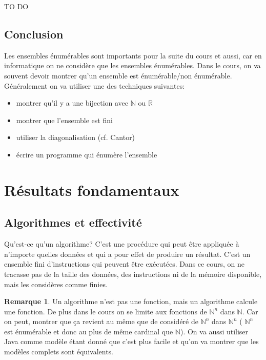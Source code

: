 \documentclass[11pt,a4paper]{article}
\newcommand{\R}{\mathbb{R}}
\newcommand{\N}{\mathbb{N}}
\theoremstyle{definition}
\newtheorem{myrem}[mydef]{Remarque}
\begin{document}
TO DO


\subsection{Conclusion}

Les ensembles énumérables sont importants pour la suite du cours et aussi, car en 
informatique on ne considère que les ensembles énumérables.
Dans le cours, on va souvent devoir montrer qu'un ensemble est énumérable/non énumérable.
Généralement on va utiliser une des techniques suivantes: 
\begin{itemize}
	\item montrer qu'il y a une bijection avec $\N$ ou $\R$
	\item montrer que l'ensemble est fini
	\item utiliser la diagonalisation (cf. Cantor)
	\item écrire un programme qui énumère l'ensemble
\end{itemize}


\section{Résultats fondamentaux}
\label{sec:r_sultats_fondamentaux}

\subsection{Algorithmes et effectivité}
\label{sub:algorithmes_et_effectivit_}
Qu'est-ce qu'un algorithme? C'est une procédure qui peut être appliquée à n'importe
quelles données et qui a pour effet de produire un résultat. C'est un ensemble fini
d'instructions qui peuvent être exécutées. Dans ce cours, on ne tracasse pas 
de la taille des données, des instructions ni de la mémoire disponible, mais 
les considères comme finies. 

\begin{myrem}
	Un algorithme n'est pas une fonction, mais un algorithme calcule une 
	fonction.
	De plus dans le cours on se limite aux fonctions de $\N^n$ dans $\N$. Car on peut,
	montrer que ça revient au même que de considéré de $\N^n$ dans $\N^n$ (
	$\N^n$ est énumérable et donc au plus de même cardinal que $\N$). On va aussi
	utiliser Java comme modèle étant donné que c'est plus facile et qu'on va montrer 
	que les modèles complets sont équivalents.
\end{myrem}
\end{document}
